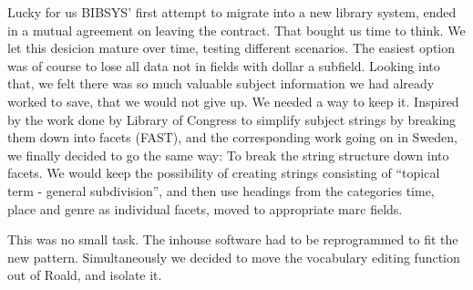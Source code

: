 Lucky for us BIBSYS' first attempt to migrate into a new library system, ended in a mutual agreement on leaving the contract. That bought us time to think. We let this desicion mature over time, testing different scenarios. The easiest option was of course to lose all data not in fields with dollar a subfield. Looking into that, we felt there was so much valuable subject information we had already worked to save, that we would not give up. We needed a way to keep it. Inspired by the work done by Library of Congress to simplify subject strings by breaking them down into facets (FAST), and the corresponding work going on in Sweden, we finally decided to go the same way: To break the string structure down into facets. We would keep the possibility of creating strings consisting of ``topical term - general subdivision'', and then use headings from the categories time, place and genre as individual facets, moved to appropriate marc fields. 

This was no small task. The inhouse software had to be reprogrammed to fit the new pattern. Simultaneously we decided to move the vocabulary editing function out of Roald, and isolate it. 